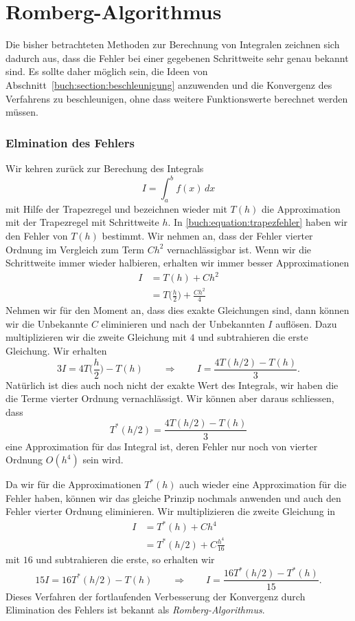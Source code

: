 %
%
%
\section{Romberg-Algorithmus
\label{buch:section:romberg}}
Die bisher betrachteten Methoden zur Berechnung von Integralen zeichnen
sich dadurch aus, dass die Fehler bei einer gegebenen Schrittweite 
sehr genau bekannt sind.
Es sollte daher möglich sein, die Ideen von
Abschnitt~\ref{buch:section:beschleunigung}
anzuwenden und die Konvergenz des Verfahrens zu beschleunigen, ohne
dass weitere Funktionswerte berechnet werden müssen.

\subsubsection{Elmination des Fehlers}
Wir kehren zurück zur Berechung des Integrals
\[
I=\int_a^b f(x)\,dx
\]
mit Hilfe der Trapezregel und bezeichnen wieder mit $T(h)$
die Approximation mit der Trapezregel mit Schrittweite $h$.
In \eqref{buch:equation:trapezfehler} haben wir den Fehler von $T(h)$
bestimmt.
Wir nehmen an, dass der Fehler vierter Ordnung im Vergleich zum Term
$Ch^2$ vernachlässigbar ist.
Wenn wir die Schrittweite immer wieder halbieren, erhalten wir immer besser
Approximationen
\begin{align*}
I&=T(h) + Ch^2
\\
&=T\biggl(\frac{h}2\biggr) + \frac{Ch^2}{4}
\end{align*}
Nehmen wir für den Moment an, dass dies exakte Gleichungen sind, dann
können wir die Unbekannte $C$ eliminieren und nach der Unbekannten $I$
auflösen.
Dazu multiplizieren wir die zweite Gleichung mit $4$ und subtrahieren
die erste Gleichung.
Wir erhalten
\[
3I= 4T\biggl(\frac{h}2\biggr) - T(h)
\qquad\Rightarrow\qquad
I= \frac{4T(h/2) - T(h)}{3}.
\]
Natürlich ist dies auch noch nicht der exakte Wert des Integrals,
wir haben die die Terme vierter Ordnung vernachlässigt.
Wir können aber daraus schliessen, dass 
\[
T^*(h/2) = \frac{4T(h/2)-T(h)}{3}
\]
eine Approximation für das Integral ist, deren Fehler nur noch
von vierter Ordnung $O(h^4)$ sein wird.

Da wir für die Approximationen $T^*(h)$ auch wieder eine Approximation
für die Fehler haben, können wir das gleiche Prinzip nochmals anwenden
und auch den Fehler vierter Ordnung eliminieren.
Wir multiplizieren die zweite Gleichung in
\begin{align*}
I&=T^*(h) + Ch^4 \\
 &=T^*(h/2) + C\frac{h^4}{16}
\end{align*}
mit $16$ und subtrahieren die erste, so erhalten wir
\[
15I = 16T^*(h/2)-T(h)
\qquad\Rightarrow\qquad
I = \frac{16T^*(h/2)-T^*(h)}{15}.
\]
Dieses Verfahren der fortlaufenden Verbesserung der Konvergenz durch
Elimination des Fehlers ist bekannt als {\em Romberg-Algorithmus}.

